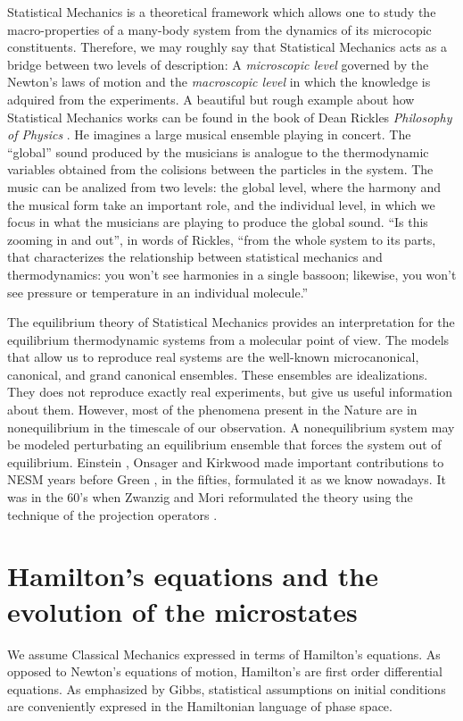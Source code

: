 \documentclass[b5paper,openright,10pt]{book}
\begin{document}
Statistical Mechanics is a theoretical framework which allows one to study the macro-properties of a many-body system from the dynamics of its microcopic constituents.
Therefore, we may roughly say that Statistical Mechanics acts as a bridge between two levels of description: A {\it microscopic level} governed by the Newton's laws of motion and the {\it macroscopic level} in which the knowledge is adquired from the experiments.
A beautiful but rough example about how Statistical Mechanics works can be found in the book of Dean Rickles {\it Philosophy of Physics} \cite{Rickles2016}.
He imagines a large musical ensemble playing in concert.
The ``global'' sound produced by the musicians is analogue to the thermodynamic variables obtained from the colisions between the particles in the system. 
The music can be analized from two levels: the global level, where the harmony and the musical form take an important role, and the individual level, in which we focus in what the musicians are playing to produce the global sound. ``Is this zooming in and out'', in words of Rickles, ``from the whole system to its parts, that characterizes the relationship between statistical mechanics and thermodynamics: you won't see harmonies in a single bassoon; likewise, you won't see pressure or temperature in an individual molecule.''

The equilibrium theory of Statistical Mechanics provides an interpretation for the equilibrium thermodynamic systems from a molecular point of view. The models that allow us to reproduce real systems are the well-known microcanonical, canonical, and grand canonical ensembles. These ensembles are idealizations. They does not reproduce exactly real experiments, but give us useful information about them. 
However, most of the phenomena present in the Nature are in nonequilibrium in the timescale of our observation. A nonequilibrium system may be modeled perturbating an equilibrium ensemble that forces the system out of equilibrium.  
Einstein \cite{Einstein1905}, Onsager \cite{Onsager1931} and Kirkwood \cite{Kirkwood1946} made important contributions to NESM years before Green \cite{Green1952, Green1954}, in the fifties, formulated it as we know nowadays. 
It was in the 60's when Zwanzig \cite{Zwanzig1961} and Mori \cite{Mori1965} reformulated the theory using the technique of the projection operators \cite{Grabert1982}. 


\section{Hamilton's equations and the evolution of the microstates}
\label{Sec:Hamilton}
We assume Classical Mechanics expressed in terms of Hamilton's equations. As opposed to Newton's equations of motion, Hamilton's are first order differential equations. As emphasized by Gibbs, statistical assumptions on initial conditions are conveniently expresed in the Hamiltonian language of phase space.
\end{document}
